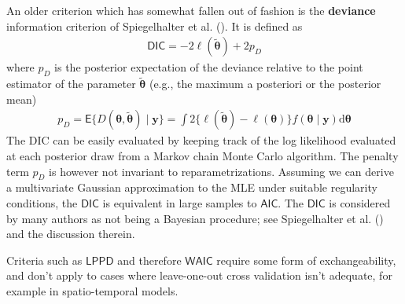 \documentclass[
  11pt,
  letterpaper,
]{scrbook}
\theoremstyle{definition}
\theoremstyle{plain}
\theoremstyle{plain}
\theoremstyle{plain}
\theoremstyle{definition}
\theoremstyle{definition}
\theoremstyle{plain}
\theoremstyle{plain}
\theoremstyle{remark}
\begin{document}
An older criterion which has somewhat fallen out of fashion is the
\textbf{deviance} information criterion of Spiegelhalter et al.
(). It is defined as
\begin{align*}
\mathsf{DIC} = -2 \ell(\widetilde{\boldsymbol{\theta}}) + 2 p_D
\end{align*} where \(p_D\) is the posterior expectation of the deviance
relative to the point estimator of the parameter
\(\widetilde{\boldsymbol{\theta}}\) (e.g., the maximum a posteriori or
the posterior mean) \begin{align*}
p_D = \mathsf{E}\{D(\boldsymbol{\theta}, \widetilde{\boldsymbol{\theta}}) \mid \boldsymbol{y}\}= \int 2 \{ \ell(\widetilde{\boldsymbol{\theta}}) - \ell(\boldsymbol{\theta})\} f(\boldsymbol{\theta} \mid \boldsymbol{y}) \mathrm{d} \boldsymbol{\theta}
\end{align*} The DIC can be easily evaluated by keeping track of the log
likelihood evaluated at each posterior draw from a Markov chain Monte
Carlo algorithm. The penalty term \(p_D\) is however not invariant to
reparametrizations. Assuming we can derive a multivariate Gaussian
approximation to the MLE under suitable regularity conditions, the
\(\mathsf{DIC}\) is equivalent in large samples to \(\mathsf{AIC}.\) The
\(\mathsf{DIC}\) is considered by many authors as not being a Bayesian
procedure; see Spiegelhalter et al.
() and the discussion therein.

Criteria such as \(\mathsf{LPPD}\) and therefore \(\mathsf{WAIC}\)
require some form of exchangeability, and don't apply to cases where
leave-one-out cross validation isn't adequate, for example in
spatio-temporal models.
\end{document}
